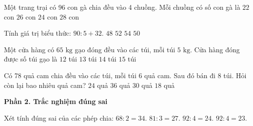 \begin{ex} %
Một trang trại có 96 con gà chia đều vào 4 chuồng. Mỗi chuồng có số con gà là
\choice
{$22$ con}
{$26$ con}
{\True $24$ con}
{$28$ con}
\end{ex}

\begin{ex} %
Tính giá trị biểu thức: $90 : 5 + 32$.
\choice
{$48$}
{$52$}
{$54$}
{\True $50$}
\end{ex}

\begin{ex} %
Một cửa hàng có $65\text{ kg}$ gạo đóng đều vào các túi, mỗi túi $5\text{ kg}$. Cửa hàng đóng được số túi gạo là
\choice
{$12$ túi}
{\True $13$ túi}
{$14$ túi}
{$15$ túi}
\end{ex}

\begin{ex} %
Có 78 quả cam chia đều vào các túi, mỗi túi 6 quả cam. Sau đó bán đi 8 túi. Hỏi còn lại bao nhiêu quả cam?
\choice
{$24$ quả}
{$36$ quả}
{\True $30$ quả}
{$18$ quả}
\end{ex}

\textbf{Phần 2. Trắc nghiệm đúng sai}

\begin{ex} %
Xét tính đúng sai của các phép chia:
\choiceTF
{\True $68 : 2 = 34$.}
{\True $81 : 3 = 27$.}
{$92 : 4 = 24$.}
{\True $92 : 4 = 23$.}
\end{ex}

